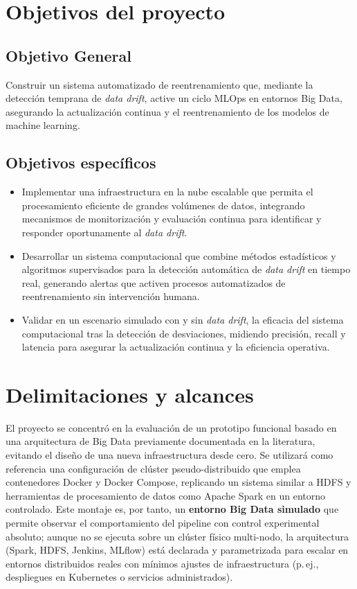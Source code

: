 \section{Objetivos del proyecto}
\subsection{Objetivo General}
Construir un sistema automatizado de reentrenamiento que, mediante la detección temprana de \emph{data drift}, active un ciclo MLOps en entornos Big Data, asegurando la actualización continua y el reentrenamiento de los modelos de machine learning.


\subsection{Objetivos específicos}
\begin{itemize}
    \item Implementar una infraestructura en la nube escalable que permita el procesamiento eficiente de grandes volúmenes de datos, integrando mecanismos de monitorización y evaluación continua para identificar y responder oportunamente al \emph{data drift}.
    
    \item Desarrollar un sistema computacional que combine métodos estadísticos y algoritmos supervisados para la detección automática de \emph{data drift} en tiempo real, generando alertas que activen procesos automatizados de reentrenamiento sin intervención humana.
    
    \item Validar en un escenario simulado con y sin \emph{data drift}, la eficacia del sistema computacional tras la detección de desviaciones, midiendo precisión, recall y latencia para asegurar la actualización continua y la eficiencia operativa.
\end{itemize} 

\section{Delimitaciones y alcances}
El proyecto se concentró en la evaluación de un prototipo funcional basado en una arquitectura de Big Data previamente documentada en la literatura, evitando el diseño de una nueva infraestructura desde cero. Se utilizará como referencia una configuración de clúster pseudo-distribuido que emplea contenedores Docker y Docker Compose, replicando un sistema similar a HDFS y herramientas de procesamiento de datos como Apache Spark en un entorno controlado. Este montaje es, por tanto, un \textbf{entorno Big Data simulado} que permite observar el comportamiento del pipeline con control experimental absoluto; aunque no se ejecuta sobre un clúster físico multi-nodo, la arquitectura (Spark, HDFS, Jenkins, MLflow) está declarada y parametrizada para escalar en entornos distribuidos reales con mínimos ajustes de infraestructura (p.\,ej., despliegues en Kubernetes o servicios administrados).

